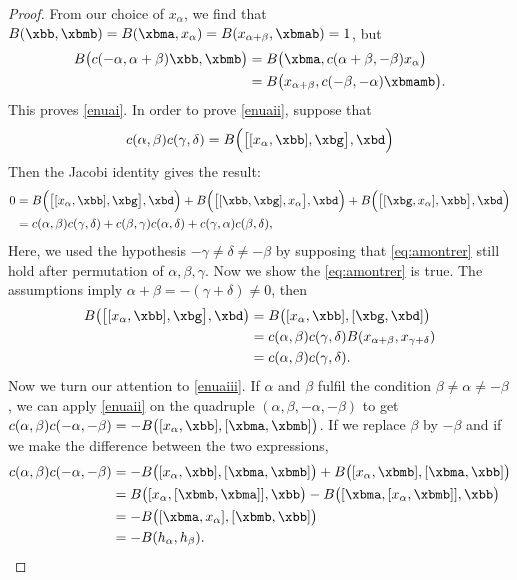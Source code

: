 \begin{proof}
From our choice of $ x_{\alpha}$, we find that $B(\xbb,\xbmb)=B(\xbma, x_{\alpha})=B(x_{\alpha+\beta},\xbmab)=1$, but
\begin{equation}
\begin{split}
  B\big(c(-\alpha,\alpha+\beta)\xbb,\xbmb\big)&=B\big(\xbma,c(\alpha+\beta,-\beta) x_{\alpha}\big)\\
                        &=B\big(x_{\alpha+\beta},c(-\beta,-\alpha)\xbmamb \big).
\end{split}                            
\end{equation}
This proves \ref{enuai}. In order to prove \ref{enuaii}, suppose that
\begin{equation}\label{eq:amontrer}
c(\alpha,\beta)c(\gamma,\delta)=B\Big(  \big[[ x_{\alpha},\xbb],\xbg\big] ,\xbd  \Big)
\end{equation}
Then the Jacobi identity gives the result:
\begin{equation}
\begin{split}
0&=B\Big( \big[[ x_{\alpha},\xbb],\xbg\big],\xbd \Big)+B\Big(\big[[\xbb,\xbg], x_{\alpha}\big],\xbd\Big)+B\Big(\big[[\xbg, x_{\alpha}],\xbb\big] ,\xbd\Big)\\
&=c(\alpha,\beta)c(\gamma,\delta)+c(\beta,\gamma)c(\alpha,\delta)+c(\gamma,\alpha)c(\beta,\delta),
\end{split}
\end{equation}
Here, we used the hypothesis $-\gamma\neq\delta\neq -\beta$ by supposing that \eqref{eq:amontrer} still hold after permutation of $\alpha,\beta,\gamma$.
Now we show the \eqref{eq:amontrer} is true. The assumptions imply  $\alpha+\beta=-(\gamma+\delta)\neq 0$, then
\begin{equation}
\begin{split}
B\big(\big[[ x_{\alpha},\xbb],\xbg \big],\xbd\big)&=B\big( [ x_{\alpha},\xbb],[\xbg,\xbd]  \big)\\
&=c(\alpha,\beta)c(\gamma,\delta)B(x_{\alpha+\beta},x_{\gamma+\delta})\\
&=c(\alpha,\beta)c(\gamma,\delta).
\end{split}
\end{equation}
Now we turn our attention to \ref{enuaiii}. If $\alpha$ and $\beta$ fulfil the condition $\beta\neq\alpha\neq-\beta$, we can apply \ref{enuaii} on the quadruple $(\alpha,\beta,-\alpha,-\beta)$ to get $c(\alpha,\beta)c(-\alpha,-\beta)=
-B\big(   [ x_{\alpha},\xbb],[\xbma,\xbmb]   \big)$. 
If we replace $\beta$ by $-\beta$ and if we make the difference between the two expressions,
\begin{equation}
\begin{split}
c(\alpha,\beta)c(-\alpha,-\beta)&=-B\big(   [ x_{\alpha},\xbb],[\xbma,\xbmb]    \big)+B\big(   [ x_{\alpha},\xbmb],[\xbma,\xbb]    \big)\\
&=B\big( [ x_{\alpha},[\xbmb,\xbma]],\xbb \big)-B\big(
[\xbma,[ x_{\alpha},\xbmb]],\xbb \big)\\
&=-B\big( [\xbma, x_{\alpha}],[\xbmb,\xbb]  \big) \\
&=-B(h_{\alpha},h_{\beta}).
\end{split}
\end{equation}


\end{proof}

